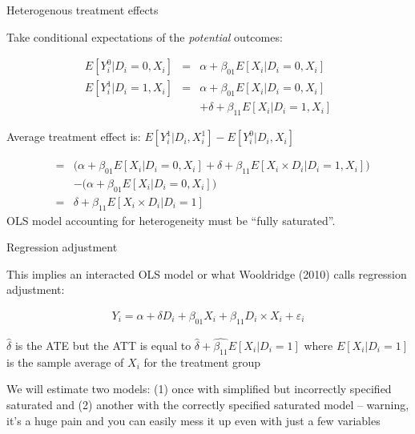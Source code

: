 \documentclass{beamer}
\begin{document}
\begin{frame}{Heterogenous treatment effects}

Take conditional expectations of the \emph{potential} outcomes:

\begin{eqnarray*}
E[Y^0_i | D_i=0, X_i] &=& \alpha + \beta_{01} E[X_i | D_i = 0, X_i] \\
E[Y^1_i | D_i=1, X_i] &=& \alpha + \beta_{01} E[X_i | D_i = 0, X_i]  \\
&& + \delta + \beta_{11} E[X_i | D_i=1,X_i]
\end{eqnarray*}

\bigskip

Average treatment effect is:  $E[Y_i^1 | D_i, X^1_i] - E[Y^0_i | D_i, X_i] $

\bigskip

\footnotesize

\begin{eqnarray*}
&=& \bigg (  \alpha + \beta_{01} E[X_i | D_i=0, X_i] + \delta + \beta_{11} E[X_i \times D_i | D_i=1,X_i] \bigg ) \\
&& -  \bigg (\alpha + \beta_{01} E[X_i  | D_i=0, X_i] \bigg ) \\
&=& \delta + \beta_{11}  E[X_i \times D_i | D_i=1] 
\end{eqnarray*}OLS model accounting for heterogeneity must be ``fully saturated''.


\end{frame}




\begin{frame}{Regression adjustment}

This implies an interacted OLS model or what Wooldridge (2010) calls regression adjustment:

\bigskip

\begin{eqnarray*}
Y_i = \alpha + \delta D_i + \beta_{01} X_i + \beta_{11} D_i \times X_i + \varepsilon_i
\end{eqnarray*}

$\widehat{\delta}$ is the ATE but the ATT is equal to $\widehat{\delta} + \widehat{\beta_{11}} E[X_i | D_i = 1]$ where $E[X_i | D_i=1]$ is the sample average of $X_i$ for the treatment group

\bigskip

We will estimate two models: (1) once with simplified but incorrectly specified saturated and (2) another with the correctly specified saturated model -- warning, it's a huge pain and you can easily mess it up even with just a few variables

\end{frame}
\end{document}
